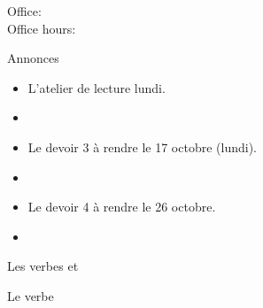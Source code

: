 \documentclass{beamer}
\subtitle[Carrières et verbes]{Les carrières et les verbes \lexi{pouvoir}, \lexi{devoir}, \lexi{vouloir}}
\begin{document}
  \begin{frame}
    \titlepage
    \tiny{Office: \\
          Office hours: }
  \end{frame}

  \begin{frame}{Annonces}
    \begin{itemize}
      \item L'atelier de lecture lundi.
      \item[] 
      \item Le devoir 3 à rendre le 17 octobre (lundi).
      \item[] 
      \item Le devoir 4 à rendre le 26 octobre.
      \item[] 
    \end{itemize}
  \end{frame}

  \begin{frame}{Les verbes  et }
    \scriptsize
        \begin{center}
          \noindent
          \noindent
        \end{center}
  \end{frame}

  \begin{frame}{Le verbe }
    \begin{center}
      
    \end{center}
  \end{frame}
\end{document}
